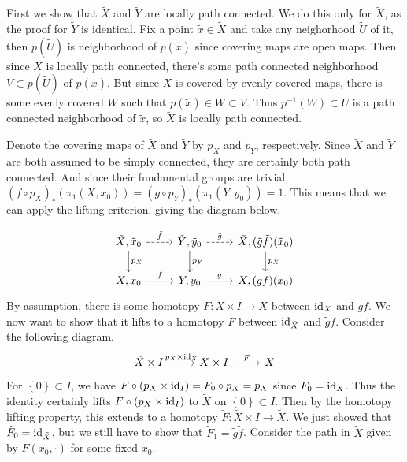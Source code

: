 \documentclass[twoside,10pt]{article}
\begin{document}
First we show that $\tilde{X}$ and $\tilde{Y}$ are locally path connected. We do this only for $\tilde{X}$, as the proof for $\tilde{Y}$ is identical. Fix a point $\tilde{x} \in \tilde{X}$ and take any neighorhood $\tilde{U}$ of it, then $p(\tilde{U})$ is neighborhood of $p(\tilde{x})$ since covering maps are open maps. Then since $X$ is locally path connected, there's some path connected neighborhood $V \subset p(\tilde{U})$ of $p(\tilde{x})$. But since $X$ is covered by evenly covered maps, there is some evenly covered $W$ such that $p(\tilde{x}) \in W \subset V$. Thus $p^{-1}(W) \subset U$ is a path connected neighborhood of $\tilde{x}$, so $\tilde{X}$ is locally path connected.

Denote the covering maps of $\tilde{X}$ and $\tilde{Y}$ by $p_X$ and $p_Y$, respectively. Since $\tilde{X}$ and $\tilde{Y}$ are both assumed to be simply connected, they are certainly both path connected. And since their fundamental groups are trivial, $(f\circ p_X)_{*}(\pi_1(X,x_0)) = (g\circ p_Y)_{*}(\pi_1(Y,y_0))=1$. This means that we can apply the lifting criterion, giving the diagram below.

\[
\begin{tikzcd}
	\tilde{X},\tilde{x}_0 \rar[dashed]{\tilde{f}} \dar{p_X} & \tilde{Y}, \tilde{y}_0 \rar[dashed]{\tilde{g}} \dar{p_Y} & \tilde{X}, (\tilde{g}\tilde{f})(\tilde{x}_0) \dar{p_X} \\
	X,x_0 \rar{f} & Y, y_0 \rar{g} & X, (gf)(x_0)
\end{tikzcd}
\] 
By assumption, there is some homotopy $F:X\times I\to X$ between $\operatorname{id}_{X}$ and $gf$. We now want to show that it lifts to a homotopy $\tilde{F}$ between $\operatorname{id}_{\tilde{X}}$ and $\tilde{g} \tilde{f}$. Consider the following diagram.
\[
\begin{tikzcd}
	\tilde{X}\times I \rar{p_X \times \id_{X}} & X \times I \rar{F} & X
\end{tikzcd}
\] For $\left\{ 0 \right\} \subset I$, we have $F\circ (p_X \times \operatorname{id}_{I}) = F_0\circ p_X = p_X$ since $F_0 = \operatorname{id}_{X}$. Thus the identity certainly lifts $F \circ (p_X \times \operatorname{id}_{I})$ to $\tilde{X}$ on $\left\{ 0 \right\}\subset I$. Then by the homotopy lifting property, this extends to a homotopy $\tilde{F}:\tilde{X}\times I \to \tilde{X}$. We just showed that $\tilde{F}_0 = \operatorname{id}_{\tilde{X}}$, but we still have to show that $\tilde{F}_1 = \tilde{g} \tilde{f}$. Consider the path in $\tilde{X}$ given by $\tilde{F}(\tilde{x}_0, \cdot)$ for some fixed $\tilde{x}_0$.
\end{document}
